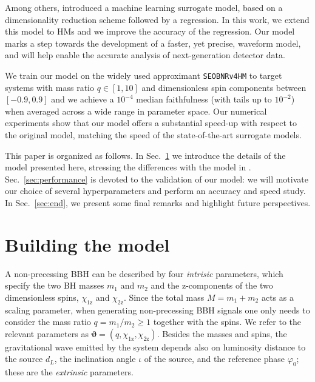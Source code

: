 \documentclass[twocolumn,showpacs,preprintnumbers,nofootinbib,prd,
superscriptaddress,10pt]{revtex4-1}
\begin{document}

Among others, \cite{Schmidt:2020yuu} introduced a machine learning surrogate model, based on a dimensionality 
reduction scheme followed by a regression. In this work, we extend this model to HMs and we improve the accuracy 
of the regression. Our model marks a step towards the development of a faster, yet precise, waveform model, and will 
help enable the accurate analysis of next-generation detector data.

We train our model on the widely used approximant \texttt{SEOBNRv4HM} \cite{Cotesta:2018fcv} to target systems 
with mass ratio $q \in [1,10]$ and dimensionless spin components between $[-0.9, 0.9]$ and we achieve a 
$10^{-4}$ median faithfulness (with tails up to $10^{-2}$) when averaged across a wide range in parameter space.
Our numerical experiments show that our model offers a substantial speed-up with respect to the original model, matching 
the speed of the state-of-the-art surrogate models.

This paper is organized as follows. In Sec.~\ref{sec:model} we introduce the details of the model presented here, 
stressing the differences with the model in  \cite{Schmidt:2020yuu}.
Sec.~\ref{sec:performance} is devoted to the validation of our model: we will motivate our choice of several 
hyperparameters and perform an accuracy and speed study.
In Sec.~\ref{sec:end}, we present some final remarks and highlight future perspectives.

\section{Building the model}
\label{sec:model}

A non-precessing BBH can be described by four {\it intrisic} parameters, which specify the two BH masses $m_1$ and $m_2$ 
and the z-components of the two dimensionless spins, $\chi_\text{1z}$ and $\chi_\text{2z}$.
Since the total mass $M = m_1 + m_2$ acts as a scaling parameter, when generating non-precessing BBH signals one  
only needs to consider the mass ratio $q = m_1/m_2 \geq 1$ together with the spins. 
We refer to the relevant parameters as $\boldsymbol{\vartheta} = (q, \chi_\text{1z}, \chi_\text{2z})$.
Besides the masses and spins, the gravitational wave emitted by the system depends also on 
luminosity distance to the source $d_L$, the inclination angle $\iota$ of the source, and the reference phase 
$\varphi_0$; these are the {\it extrinsic} parameters.
\end{document}
